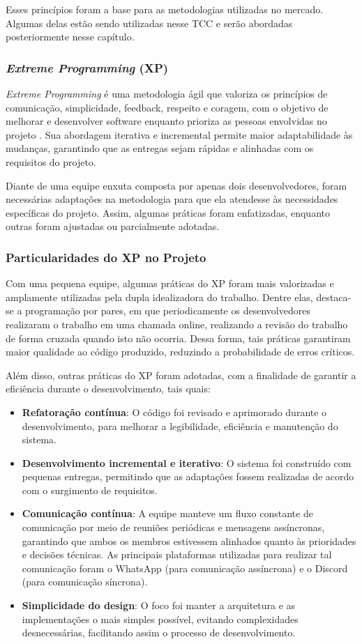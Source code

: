 Esses princípios foram a base para as metodologias utilizadas no mercado. Algumas delas estão sendo utilizadas nesse TCC e serão abordadas posteriormente nesse capítulo.

\subsubsection{\textit{Extreme Programming} (XP)}
\textit{Extreme Programming} é uma metodologia ágil que valoriza os princípios de comunicação, simplicidade, feedback, respeito e coragem, com o objetivo de melhorar e desenvolver software enquanto prioriza as pessoas envolvidas no projeto \cite{extremeprogramming}. Sua abordagem iterativa e incremental permite maior adaptabilidade às mudanças, garantindo que as entregas sejam rápidas e alinhadas com os requisitos do projeto. 

Diante de uma equipe enxuta composta por apenas dois desenvolvedores, foram necessárias adaptações na metodologia para que ela atendesse às necessidades específicas do projeto. Assim, algumas práticas foram enfatizadas, enquanto outras foram ajustadas ou parcialmente adotadas.

\subsubsection{Particularidades do XP no Projeto}
Com uma pequena equipe, algumas práticas do XP foram mais valorizadas e amplamente utilizadas pela dupla idealizadora do trabalho. Dentre elas, destaca-se a programação por pares, em que periodicamente os desenvolvedores realizaram o trabalho em uma chamada online, realizando a revisão do trabalho de forma cruzada quando isto não ocorria. Dessa forma, tais práticas garantiram maior qualidade ao código produzido, reduzindo a probabilidade de erros críticos.

Além disso, outras práticas do XP foram adotadas, com a finalidade de garantir a eficiência durante o desenvolvimento, tais quais:

\begin{itemize}
    \item \textbf{Refatoração contínua}: O código foi revisado e aprimorado durante o desenvolvimento, para melhorar a legibilidade, eficiência e manutenção do sistema.
    \item \textbf{Desenvolvimento incremental e iterativo}: O sistema foi construído com pequenas entregas, permitindo que as adaptações fossem realizadas de acordo com o surgimento de requisitos.
    \item \textbf{Comunicação contínua}: A equipe manteve um fluxo constante de comunicação por meio de reuniões periódicas e mensagens assíncronas, garantindo que ambos os membros estivessem alinhados quanto às prioridades e decisões técnicas. As principais plataformas utilizadas para realizar tal comunicação foram o WhatsApp (para comunicação assíncrona) e o Discord (para comunicação síncrona).
    \item \textbf{Simplicidade do design}: O foco foi manter a arquitetura e as implementações o mais simples possível, evitando complexidades desnecessárias, facilitando assim o processo de desenvolvimento.
\end{itemize}


